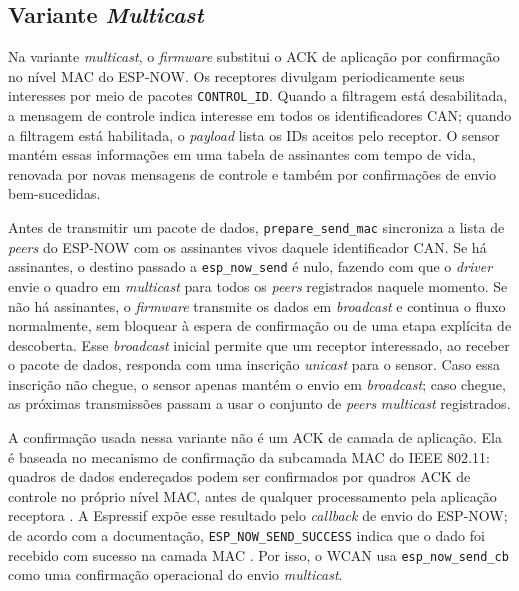 \subsection{Variante \emph{Multicast}}

Na variante \emph{multicast}, o \emph{firmware} substitui o ACK de aplicação por confirmação no
nível MAC do ESP-NOW. Os receptores divulgam periodicamente seus interesses por
meio de pacotes \texttt{CONTROL\_ID}. Quando a filtragem está desabilitada, a
mensagem de controle indica interesse em todos os identificadores CAN; quando a filtragem está
habilitada, o \emph{payload} lista os IDs aceitos pelo receptor. O sensor mantém essas
informações em uma tabela de assinantes com tempo de vida, renovada por novas
mensagens de controle e também por confirmações de envio bem-sucedidas.

Antes de transmitir um pacote de dados, \texttt{prepare\_send\_mac} sincroniza a
lista de \emph{peers} do ESP-NOW com os assinantes vivos daquele identificador CAN. Se há
assinantes, o destino passado a \texttt{esp\_now\_send} é nulo, fazendo com que o
\emph{driver} envie o quadro em \emph{multicast} para todos os \emph{peers} registrados naquele
momento. Se não há assinantes, o \emph{firmware} transmite os dados em \emph{broadcast} e
continua o fluxo normalmente, sem bloquear à espera de confirmação ou de uma
etapa explícita de descoberta. Esse \emph{broadcast} inicial permite que um receptor
interessado, ao receber o pacote de dados, responda com uma inscrição \emph{unicast}
para o sensor. Caso essa inscrição não chegue, o sensor apenas mantém o envio em
\emph{broadcast}; caso chegue, as próximas transmissões passam a usar o conjunto de
\emph{peers} \emph{multicast} registrados.

A confirmação usada nessa variante não é um ACK de camada de aplicação. Ela é
baseada no mecanismo de confirmação da subcamada MAC do IEEE 802.11: quadros de
dados endereçados podem ser confirmados por quadros ACK de controle no próprio
nível MAC, antes de qualquer processamento pela aplicação receptora
\cite{ieee80211_2024}. A Espressif expõe esse resultado pelo \emph{callback} de envio do
ESP-NOW; de acordo com a documentação, \texttt{ESP\_NOW\_SEND\_SUCCESS} indica
que o dado foi recebido com sucesso na camada MAC \cite{espressif_espnow_programming_guide}.
Por isso, o WCAN usa \texttt{esp\_now\_send\_cb} como uma confirmação operacional
do envio \emph{multicast}.

